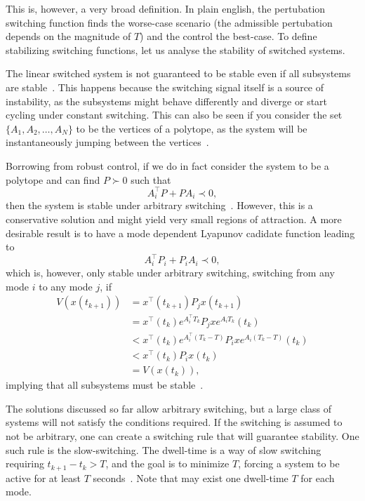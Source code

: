 This is, however, a very broad definition. In plain english, the pertubation
switching function finds the worse-case scenario (the admissible pertubation
depends on the magnitude of \(T\)) and the control the best-case. To define
stabilizing switching functions, let us analyse the stability of switched
systems.

The linear switched system is not guaranteed to be stable even if all subsystems
are stable~\parencite{liberzon.morse:basic}. This happens because the switching
signal itself is a source of instability, as the subsystems might behave
differently and diverge or start cycling under constant switching. This can also
be seen if you consider the set \(\{A_{1}, A_{2}, \ldots, A_{N}\}\) to be the
vertices of a polytope, as the system will be instantaneously jumping between
the vertices~\parencite{geromel.colaneri:stabilization}.

Borrowing from robust control, if we do in fact consider the system to be a
polytope and can find \(P\succ{}0\) such that
%
\begin{equation}
  A_{i}^{\top}P+PA_{i} \prec{} 0,
\end{equation}
%
then the system is stable under arbitrary
switching~\parencite{geromel.deaecto:stability}. However, this is a conservative
solution and might yield very small regions of attraction. A more desirable
result is to have a mode dependent Lyapunov cadidate function leading to
%
\begin{equation}
  A_{i}^{\top}P_{i}+P_{i}A_{i} \prec{} 0,
\end{equation}
%
which is, however, only stable under arbitrary switching, switching from any
mode \(i\) to any mode \(j\), if
%
\begin{align}
  V(x(t_{k+1})) & = x^{\top}(t_{k+1})P_{j}x(t_{k+1})                                        \\
                & = x^{\top}(t_{k})e^{A^{\top}_{i}T_{k}}P_{j}xe^{A_{i}T_{k}}(t_{k})         \\
                & < x^{\top}(t_{k})e^{A^{\top}_{i}(T_{k}-T)}P_{i}xe^{A_{i}(T_{k}-T)}(t_{k}) \\
                & < x^{\top}(t_{k})P_{i}x(t_{k})                                            \\
                & = V(x(t_{k})),
\end{align}
%
implying that all subsystems must be
stable~\parencite{geromel.colaneri:stabilization}.

The solutions discussed so far allow arbitrary switching, but a large class of
systems will not satisfy the conditions required. If the switching is assumed to
not be arbitrary, one can create a switching rule that will guarantee stability.
One such rule is the slow-switching. The dwell-time is a way of slow switching
requiring \(t_{k+1}-t_{k}>T\), and the goal is to minimize \(T\), forcing a
system to be active for at least \(T\)
seconds~\parencite{chesi.colaneri.ea:computing,franzè.lucia.ea:command,liberzon.morse:basic}.
Note that may exist one dwell-time \(T\) for each mode.

